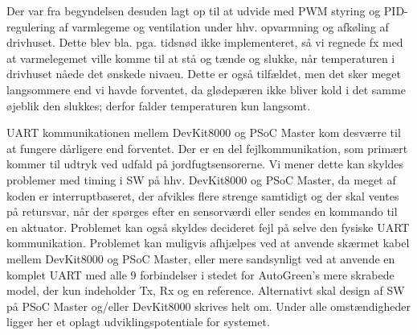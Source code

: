 Der var fra begyndelsen desuden lagt op til at udvide med PWM styring og PID-regulering af varmlegeme og ventilation under hhv. opvarmning og afkøling af drivhuset. 
Dette blev bla. pga. tidsnød ikke implementeret, så vi regnede fx med at varmelegemet ville komme til at stå og tænde og slukke, når temperaturen i drivhuset nåede det ønskede nivaeu. 
Dette er også tilfældet, men det sker meget langsommere end vi havde forventet, da glødepæren ikke bliver kold i det samme øjeblik den slukkes; derfor falder temperaturen kun langsomt. 

UART kommunikationen mellem DevKit8000 og PSoC Master kom desværre til at fungere dårligere end forventet.
Der er en del fejlkommunikation, som primært kommer til udtryk ved udfald på jordfugtsensorerne. 
Vi mener dette kan skyldes problemer med timing i SW på hhv. DevKit8000 og PSoC Master, da meget af koden er interruptbaseret, der afvikles flere strenge samtidigt og der skal ventes på retursvar, når der spørges efter en sensorværdi eller sendes en kommando til en aktuator. 
Problemet kan også skyldes decideret fejl på selve den fysiske UART kommunikation.
Problemet kan muligvis afhjælpes ved at anvende skærmet kabel mellem DevKit8000 og PSoC Master, eller mere sandsynligt ved at anvende en komplet UART med alle 9 forbindelser i stedet for AutoGreen's mere skrabede model, der kun indeholder Tx, Rx og en reference.
Alternativt skal design af SW på PSoC Master og/eller DevKit8000 skrives helt om. 
Under alle omstændigheder ligger her et oplagt udviklingspotentiale for systemet.
\clearpage